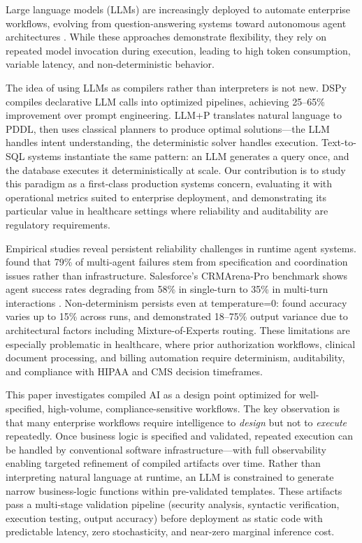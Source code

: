 \documentclass[11pt]{article}
\begin{document}
Large language models (LLMs) are increasingly deployed to automate enterprise workflows, evolving from question-answering systems toward autonomous agent architectures \citep{autogen2024, crewai2024, langchain2022}. While these approaches demonstrate flexibility, they rely on repeated model invocation during execution, leading to high token consumption, variable latency, and non-deterministic behavior.

The idea of using LLMs as compilers rather than interpreters is not new. DSPy \citep{khattab2023dspy} compiles declarative LLM calls into optimized pipelines, achieving 25--65\% improvement over prompt engineering. LLM+P \citep{liu2023llmp} translates natural language to PDDL, then uses classical planners to produce optimal solutions---the LLM handles intent understanding, the deterministic solver handles execution. Text-to-SQL systems instantiate the same pattern: an LLM generates a query once, and the database executes it deterministically at scale. Our contribution is to study this paradigm as a first-class production systems concern, evaluating it with operational metrics suited to enterprise deployment, and demonstrating its particular value in healthcare settings where reliability and auditability are regulatory requirements.

Empirical studies reveal persistent reliability challenges in runtime agent systems. \citet{cemri2025multiagent} found that 79\% of multi-agent failures stem from specification and coordination issues rather than infrastructure. Salesforce's CRMArena-Pro benchmark shows agent success rates degrading from 58\% in single-turn to 35\% in multi-turn interactions \citep{salesforce2025agents}. Non-determinism persists even at temperature=0: \citet{atil2024nondeterminism} found accuracy varies up to 15\% across runs, and \citet{ouyang2023nondeterminism} demonstrated 18--75\% output variance due to architectural factors including Mixture-of-Experts routing. These limitations are especially problematic in healthcare, where prior authorization workflows, clinical document processing, and billing automation require determinism, auditability, and compliance with HIPAA and CMS decision timeframes.

This paper investigates compiled AI as a design point optimized for well-specified, high-volume, compliance-sensitive workflows. The key observation is that many enterprise workflows require intelligence to \emph{design} but not to \emph{execute} repeatedly. Once business logic is specified and validated, repeated execution can be handled by conventional software infrastructure---with full observability enabling targeted refinement of compiled artifacts over time. Rather than interpreting natural language at runtime, an LLM is constrained to generate narrow business-logic functions within pre-validated templates. These artifacts pass a multi-stage validation pipeline (security analysis, syntactic verification, execution testing, output accuracy) before deployment as static code with predictable latency, zero stochasticity, and near-zero marginal inference cost.
\end{document}
